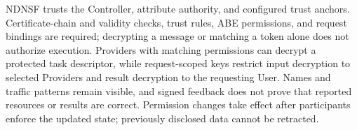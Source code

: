 NDNSF trusts the Controller, attribute authority, and configured trust anchors. Certificate-chain and validity checks, trust rules, ABE permissions, and request bindings are required; decrypting a message or matching a token alone does not authorize execution. Providers with matching permissions can decrypt a protected task descriptor, while request-scoped keys restrict input decryption to selected Providers and result decryption to the requesting User. Names and traffic patterns remain visible, and signed feedback does not prove that reported resources or results are correct. Permission changes take effect after participants enforce the updated state; previously disclosed data cannot be retracted.
